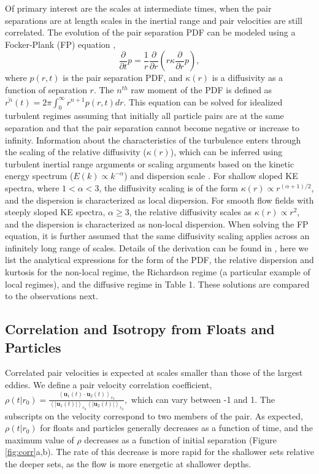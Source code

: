 \documentclass[]{ametsoc}
\begin{document}
Of primary interest are the scales at intermediate times, when the pair separations are at length scales in the inertial range and pair velocities are still correlated. The evolution of the pair separation PDF can be modeled using a Focker-Plank (FP) equation \citep{richardson1926atmospheric}, 
\begin{equation}
    \frac{\partial}{\partial t} p = \frac{1}{r} \frac{\partial}{\partial r} \left(r \kappa  \frac{\partial}{\partial r} p\right),
\label{eqn:PDF}
\end{equation}
where $p(r,t)$ is the pair separation PDF, and $\kappa (r)$ is a diffusivity as a function of separation $r$. The $n^{th}$ raw moment of the PDF is defined as $\overline{r^n} (t) = 2 \pi \int_0^\infty r^{n+1} p (r,t) dr$. This equation can be solved for idealized turbulent regimes \citep{lacasce2010relative, graff2015relative} assuming that initially all particle pairs are at the same separation and that the pair separation cannot become negative or increase to infinity. Information about the characteristics of the turbulence enters through the scaling of the relative diffusivity ($\kappa(r)$), which can be inferred using turbulent inertial range arguments \citep{lacasce2010relative} or scaling arguments based on the kinetic energy spectrum ($E(k) \propto k^{-\alpha}$) and dispersion scale \citep{morel1974relative, foussard2017relative}. For shallow sloped KE spectra, where $1 <\alpha <3$, the diffusivity scaling is of the form $\kappa (r)  \propto r^{(\alpha + 1)/2}$, and the dispersion is characterized as local dispersion. For smooth flow fields with steeply sloped KE spectra, $\alpha \geq 3$, the relative diffusivity scales as $\kappa(r) \propto r^{2}$, and the dispersion is characterized as non-local dispersion. When solving the FP equation, it is further assumed that the same diffusivity scaling applies across an infinitely long range of scales. Details of the derivation can be found in \citet{graff2015relative}, here we list the analytical expressions for the form of the PDF, the relative dispersion and kurtosis for the non-local regime, the Richardson regime (a particular example of local regimes), and the diffusive regime in Table 1. These solutions are compared to the observations next.

\subsection{Correlation and Isotropy from Floats and Particles}
Correlated pair velocities is expected at scales smaller than those of the largest eddies. We define a pair velocity correlation coefficient, 
$
    \rho (t|r_0) = \frac{\left< \mathbf{u}_1(t) \cdot \mathbf{u}_2(t)\right>_{r_0}}{\left<|\mathbf{u}_1(t)|\right>_{r_0}\left<|\mathbf{u}_2(t)|\right>_{r_0}},
$
which can vary between -1 and 1. The subscripts on the velocity correspond to two members of the pair. As expected, $\rho (t| r_0)$ for floats and particles generally decreases as a function of time, and the maximum value of $\rho$ decreases as a function of initial separation (Figure \ref{fig:corr}a,b). The rate of this decrease is more rapid for the shallower sets relative the deeper sets, as the flow is more energetic at shallower depths.
\end{document}
